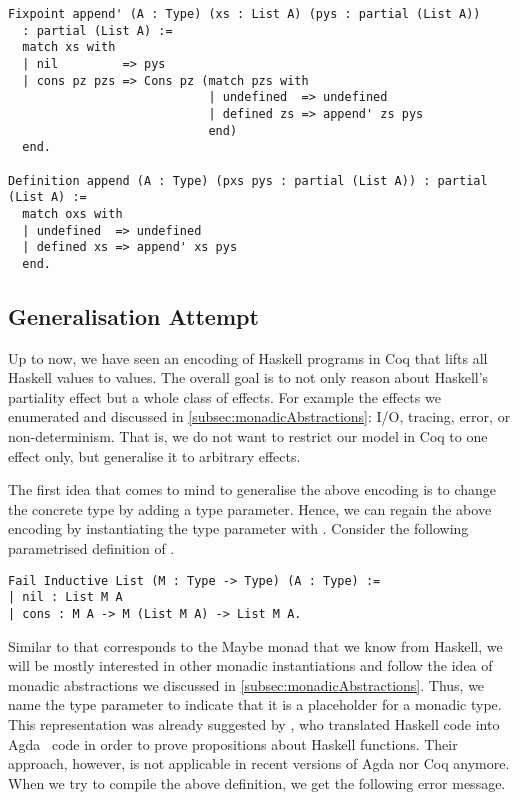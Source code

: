 \begin{verbatim}
Fixpoint append' (A : Type) (xs : List A) (pys : partial (List A))
  : partial (List A) :=
  match xs with
  | nil         => pys
  | cons pz pzs => Cons pz (match pzs with
                            | undefined  => undefined
                            | defined zs => append' zs pys
                            end)
  end.

Definition append (A : Type) (pxs pys : partial (List A)) : partial (List A) :=
  match oxs with
  | undefined  => undefined
  | defined xs => append' xs pys
  end.
\end{verbatim}

\subsection{Generalisation Attempt}
\label{subsec:genericLifting}

Up to now, we have seen an encoding of Haskell programs in Coq that lifts all Haskell values to  values.
The overall goal is to not only reason about Haskell's partiality effect but a whole class of effects.
For example the effects we enumerated and discussed in \autoref{subsec:monadicAbstractions}: I/O, tracing, error, or non\--determinism.
That is, we do not want to restrict our model in Coq to one effect only, but generalise it to arbitrary effects.

The first idea that comes to mind to generalise the above encoding is to change the concrete type  by adding a type parameter.
Hence, we can regain the above encoding by instantiating the type parameter with .
Consider the following parametrised definition of .

\begin{verbatim}
Fail Inductive List (M : Type -> Type) (A : Type) :=
| nil : List M A
| cons : M A -> M (List M A) -> List M A.
\end{verbatim}

Similar to  that corresponds to the Maybe monad that we know from Haskell, we will be mostly interested in other monadic instantiations and follow the idea of monadic abstractions we discussed in \autoref{subsec:monadicAbstractions}.
Thus, we name the type parameter  to indicate that it is a placeholder for a monadic type.
This representation was already suggested by \citet{abel2005verifying}, who translated Haskell code into Agda~\citep{norell2008dependently} code in order to prove propositions about Haskell functions.
Their approach, however, is not applicable in recent versions of Agda nor Coq anymore.
When we try to compile the above definition, we get the following error message.

